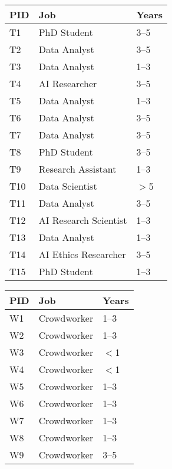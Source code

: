\begin{table*}
\centering
\begin{minipage}[b]{0.32\textwidth} %
\centering
\begin{tabular}{lll}
\toprule
\textbf{PID} & \textbf{Job} & \textbf{Years} \\
\midrule
T1 & PhD Student & 3--5 \\
T2 & Data Analyst & 3--5 \\
T3 & Data Analyst & 1--3 \\
T4 & AI Researcher & 3--5 \\
T5 & Data Analyst & 1--3 \\
T6 & Data Analyst & 3--5 \\
T7 & Data Analyst & 3--5 \\
T8 & PhD Student & 3--5 \\
T9 & Research Assistant & 1--3 \\
T10 & Data Scientist & $>$5 \\
T11 & Data Analyst & 3--5 \\
T12 & AI Research Scientist & 1--3 \\
T13 & Data Analyst & 1--3 \\
T14 & AI Ethics Researcher & 3--5 \\
T15 & PhD Student & 1--3 \\
\bottomrule
\end{tabular}
\caption{Task Designer Participants}
\end{minipage}
\hfill
\begin{minipage}[b]{0.32\textwidth}
\centering
\begin{tabular}{lll}
\toprule
\textbf{PID} & \textbf{Job} & \textbf{Years} \\
\midrule
W1 & Crowdworker & 1--3 \\
W2 & Crowdworker & 1--3 \\
W3 & Crowdworker & $<$1 \\
W4 & Crowdworker & $<$1 \\
W5 & Crowdworker & 1--3 \\
W6 & Crowdworker & 1--3 \\
W7 & Crowdworker & 1--3 \\
W8 & Crowdworker & 1--3 \\
W9 & Crowdworker & 3--5 \\

\end{tabular}
\end{minipage}
\end{table*}
